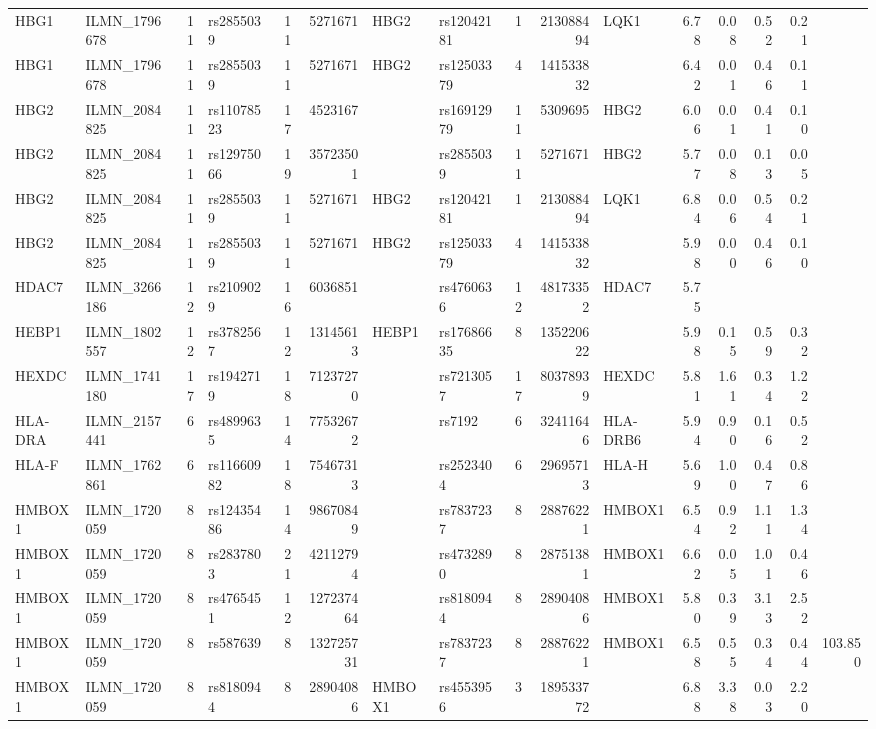 \documentclass{article}
\begin{document}
\begin{landscape}
{\begin{ThreePartTable}
\begin{longtable}{|llr|lrrl|lrrl|rrrr|r|}
  HBG1 & ILMN\_1796678 & 11 & rs2855039 & 11 & 5271671 & HBG2 & rs12042181 & 1 & 213088494 & LQK1 & 6.78 & 0.08 & 0.52 & 0.21 &  \\
  HBG1 & ILMN\_1796678 & 11 & rs2855039 & 11 & 5271671 & HBG2 & rs12503379 & 4 & 141533832 &  & 6.42 & 0.01 & 0.46 & 0.11 &  \\
  HBG2 & ILMN\_2084825 & 11 & rs11078523 & 17 & 4523167 &  & rs16912979 & 11 & 5309695 & HBG2 & 6.06 & 0.01 & 0.41 & 0.10 &  \\
  HBG2 & ILMN\_2084825 & 11 & rs12975066 & 19 & 35723501 &  & rs2855039 & 11 & 5271671 & HBG2 & 5.77 & 0.08 & 0.13 & 0.05 &  \\
  HBG2 & ILMN\_2084825 & 11 & rs2855039 & 11 & 5271671 & HBG2 & rs12042181 & 1 & 213088494 & LQK1 & 6.84 & 0.06 & 0.54 & 0.21 &  \\
  HBG2 & ILMN\_2084825 & 11 & rs2855039 & 11 & 5271671 & HBG2 & rs12503379 & 4 & 141533832 &  & 5.98 & 0.00 & 0.46 & 0.10 &  \\
  HDAC7 & ILMN\_3266186 & 12 & rs2109029 & 16 & 6036851 &  & rs4760636 & 12 & 48173352 & HDAC7 & 5.75 &  &  &  &  \\
  HEBP1 & ILMN\_1802557 & 12 & rs3782567 & 12 & 13145613 & HEBP1 & rs17686635 & 8 & 135220622 &  & 5.98 & 0.15 & 0.59 & 0.32 &  \\
  HEXDC & ILMN\_1741180 & 17 & rs1942719 & 18 & 71237270 &  & rs7213057 & 17 & 80378939 & HEXDC & 5.81 & 1.61 & 0.34 & 1.22 &  \\
  HLA-DRA & ILMN\_2157441 & 6 & rs4899635 & 14 & 77532672 &  & rs7192 & 6 & 32411646 & HLA-DRB6 & 5.94 & 0.90 & 0.16 & 0.52 &  \\
  HLA-F & ILMN\_1762861 & 6 & rs11660982 & 18 & 75467313 &  & rs2523404 & 6 & 29695713 & HLA-H & 5.69 & 1.00 & 0.47 & 0.86 &  \\
  HMBOX1 & ILMN\_1720059 & 8 & rs12435486 & 14 & 98670849 &  & rs7837237 & 8 & 28876221 & HMBOX1 & 6.54 & 0.92 & 1.11 & 1.34 &  \\
  HMBOX1 & ILMN\_1720059 & 8 & rs2837803 & 21 & 42112794 &  & rs4732890 & 8 & 28751381 & HMBOX1 & 6.62 & 0.05 & 1.01 & 0.46 &  \\
  HMBOX1 & ILMN\_1720059 & 8 & rs4765451 & 12 & 127237464 &  & rs8180944 & 8 & 28904086 & HMBOX1 & 5.80 & 0.39 & 3.13 & 2.52 &  \\
  HMBOX1 & ILMN\_1720059 & 8 & rs587639 & 8 & 132725731 &  & rs7837237 & 8 & 28876221 & HMBOX1 & 6.58 & 0.55 & 0.34 & 0.44 & 103.850 \\
  HMBOX1 & ILMN\_1720059 & 8 & rs8180944 & 8 & 28904086 & HMBOX1 & rs4553956 & 3 & 189533772 &  & 6.88 & 3.38 & 0.03 & 2.20 &  \\

\end{longtable}
\end{ThreePartTable}}
\end{landscape}
\end{document}
